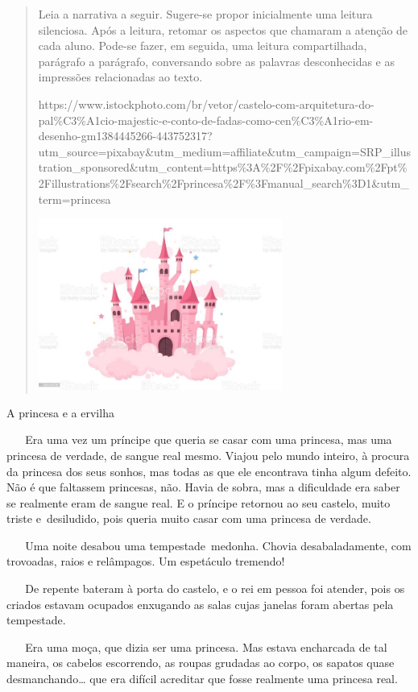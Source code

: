 \begin{quote}
Leia a narrativa a seguir. Sugere-se propor inicialmente uma leitura
silenciosa. Após a leitura, retomar os aspectos que chamaram a atenção
de cada aluno. Pode-se fazer, em seguida, uma leitura compartilhada,
parágrafo a parágrafo, conversando sobre as palavras desconhecidas e as
impressões relacionadas ao texto.

https://www.istockphoto.com/br/vetor/castelo-com-arquitetura-do-pal\%C3\%A1cio-majestic-e-conto-de-fadas-como-cen\%C3\%A1rio-em-desenho-gm1384445266-443752317?utm\_source=pixabay\&utm\_medium=affiliate\&utm\_campaign=SRP\_illustration\_sponsored\&utm\_content=https\%3A\%2F\%2Fpixabay.com\%2Fpt\%2Fillustrations\%2Fsearch\%2Fprincesa\%2F\%3Fmanual\_search\%3D1\&utm\_term=princesa

\includegraphics[width=3.15101in,height=2.21875in]{media/image34.jpeg}
\end{quote}

A princesa e a ervilha

~ ~ Era uma vez um príncipe que queria se casar com uma princesa, mas
uma princesa de verdade, de sangue real mesmo. Viajou pelo mundo
inteiro, à procura da princesa dos seus sonhos, mas todas as que ele
encontrava tinha algum defeito. Não é que faltassem princesas, não.
Havia de sobra, mas a dificuldade era saber se realmente eram de sangue
real. E o príncipe retornou ao seu castelo, muito triste e~desiludido,
pois queria muito casar com uma princesa de verdade.

~ ~ Uma noite desabou uma tempestade~medonha. Chovia desabaladamente,
com trovoadas, raios e relâmpagos. Um espetáculo tremendo!

~ ~ De repente bateram à porta do castelo, e o rei em pessoa foi
atender, pois os criados estavam ocupados enxugando as salas cujas
janelas foram abertas pela tempestade.

~ ~ Era uma moça, que dizia ser uma princesa. Mas estava encharcada de
tal maneira, os cabelos escorrendo, as roupas grudadas ao corpo, os
sapatos quase desmanchando\ldots{} que era difícil acreditar que fosse
realmente uma princesa real.

